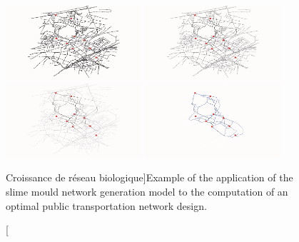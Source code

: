 \begin{figure}
\includegraphics[width=0.45\textwidth]{Figures/NetworkGrowth/tick1}
\includegraphics[width=0.45\textwidth]{Figures/NetworkGrowth/tick20}\\
\includegraphics[width=0.45\textwidth]{Figures/NetworkGrowth/tick50}
\includegraphics[width=0.45\textwidth]{Figures/NetworkGrowth/reseauFinal}
\caption[Biological Network Growth][Croissance de réseau biologique]{Example of the application of the slime mould network generation model to the computation of an optimal public transportation network design.}{}
\label{fig:slimemould}
\end{figure}








